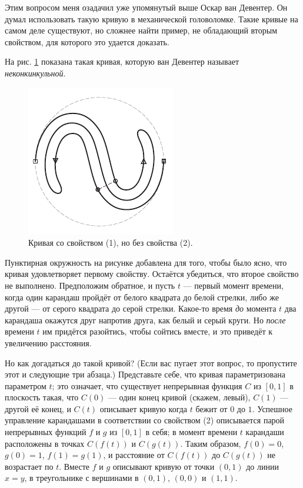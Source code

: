 Этим вопросом меня озадачил уже упомянутый выше Оскар ван Девентер.
Он думал использовать такую кривую в механической головоломке.
Такие кривые на самом деле существуют, но сложнее найти пример, не обладающий вторым свойством, для которого это удается доказать.

На рис. \ref{pic:ss-curve} показана такая кривая, которую ван Девентер называет \emph{неконкинкульной}.

\begin{figure}[htb!]
\centering
\includegraphics[scale=1]{pics/ss-curve}
\caption{Кривая со свойством (1), но без свойства (2).}
\label{pic:ss-curve}
\end{figure}

Пунктирная окружность на рисунке добавлена для того, чтобы было ясно, что кривая удовлетворяет первому свойству.
Остаётся убедиться, что второе свойство не выполнено.
Предположим обратное, и пусть $t$ --- первый момент времени, когда один карандаш пройдёт от белого квадрата до белой стрелки,
либо же другой --- от серого квадрата до серой стрелки.
Какое-то время \emph{до} момента $t$ два карандаша окажутся друг напротив друга, как белый и серый круги.
Но \emph{после} времени $t$ им придётся разойтись, чтобы сойтись вместе, и это приведёт к увеличению расстояния.

Но как догадаться до такой кривой?
(Если вас пугает этот вопрос, то пропустите этот и следующие три абзаца.)
Представьте себе, что кривая параметризована параметром $t$;
это означает, что существует непрерывная функция $C$ из $[0, 1]$ в плоскость такая, что $C(0)$ --- один конец кривой (скажем, левый), $C(1)$ --- другой её конец, и $C(t)$ описывает кривую когда $t$ бежит от $0$ до $1$.
Успешное управление карандашами в соответствии со свойством (2) описывается парой непрерывных функций $f$ и $g$ из $[0,1]$ в себя;
в момент времени $t$ карандаши расположены в точках $C(f(t))$ и $C(g(t))$.
Таким образом, $f (0) = 0$, $g(0) = 1$, $f (1) = g(1)$, и расстояние от $C(f (t))$ до $C(g(t))$ не возрастает по $t$.
Вместе $f$ и $g$ описывают кривую от точки $(0,1)$ до линии $x = y$, в треугольнике с вершинами в $(0,1)$, $(0,0)$ и $(1,1)$.

